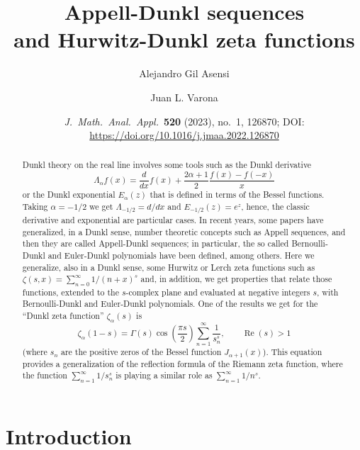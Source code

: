 \documentclass[a4paper]{amsart}
\title[Appell-Dunkl sequences and Hurwitz-Dunkl zeta functions]%
{Appell-Dunkl sequences\\and Hurwitz-Dunkl zeta functions}
\author[A. Gil Asensi]{Alejandro Gil Asensi}
\author[J.~L.~Varona]{Juan L. Varona}
\date{\textit{J.\ Math.\ Anal.\ Appl.}\ \textbf{520} (2023), no.~1, 126870; 
DOI: \url{https://doi.org/10.1016/j.jmaa.2022.126870}}
\theoremstyle{plain}
\theoremstyle{definition}
\theoremstyle{remark}
\numberwithin{equation}{section}
\begin{document}

\begin{abstract}
Dunkl theory on the real line involves some tools such as the Dunkl derivative
\[
\Lambda_\alpha f(x) = \frac{d}{dx}f(x) + \frac{2\alpha+1}{2} \frac{f(x)-f(-x)}{x}
\]
or the Dunkl exponential $E_{\alpha}(z)$ that is defined in terms of 
the Bessel functions. 
Taking $\alpha=-1/2$ we get $\Lambda_{-1/2} = d/dx$ and 
$E_{-1/2}(z) = e^z$, hence, the classic derivative and exponential
are particular cases.
In recent years, some papers have generalized, in a Dunkl sense, 
number theoretic concepts such as Appell sequences, and then they are called
Appell-Dunkl sequences; in particular, the so called Bernoulli-Dunkl 
and Euler-Dunkl polynomials have been defined, among others. 
Here we generalize, also in a Dunkl sense, some Hurwitz or Lerch 
zeta functions such as $\zeta(s,x) = \sum_{n=0}^{\infty} 1/(n+x)^s$ 
and, in addition, we get properties that relate those functions,
extended to the $s$-complex plane and evaluated at negative integers $s$, 
with Bernoulli-Dunkl and Euler-Dunkl polynomials. One of the results we get 
for the ``Dunkl zeta function'' $\zeta_\alpha(s)$ is
\[
 \zeta_{\alpha}(1-s) = \Gamma(s) \cos{\left(\frac{\pi s}{2}\right)} 
    \sum_{n=1}^{\infty} \frac{1}{s_n^s}, 
    \qquad \operatorname{Re}(s)>1
\]
(where $s_n$ are the positive zeros of the 
Bessel function $J_{\alpha+1}(x)$). This equation 
provides a generalization of the reflection formula of the 
Riemann zeta function, where the function $\sum_{n=1}^{\infty} 1/s_n^s$ 
is playing a similar role as $\sum_{n=1}^{\infty} 1/n^s$.
\end{abstract}


\maketitle


\section{Introduction}
\end{document}

